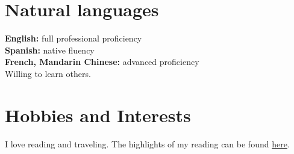 \documentclass[11pt]{article}
\begin{document}
\section*{Natural languages}
\label{sec:org4d25193}
\textbf{English:} full professional proficiency\\
\textbf{Spanish:} native fluency\\
\textbf{French, Mandarin Chinese:} advanced proficiency\\
Willing to learn others.\\
\section*{Hobbies and Interests}
\label{sec:orgd094449}
I love reading and traveling. The highlights of my reading can be found \href{https://github.com/RCoeurjoly/my\_clippings/blob/master/clippings.org}{here}.\\
\end{document}
